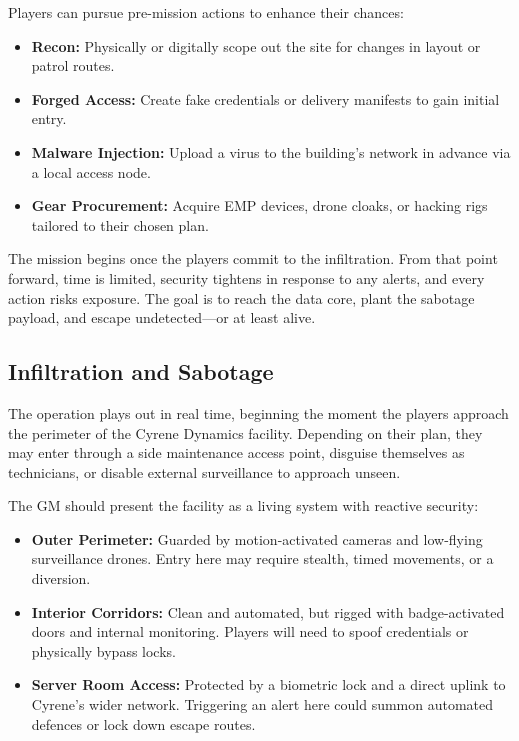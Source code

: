 Players can pursue pre-mission actions to enhance their chances:
\begin{itemize}
    \item \textbf{Recon:} Physically or digitally scope out the site for changes in layout or patrol routes.
    \item \textbf{Forged Access:} Create fake credentials or delivery manifests to gain initial entry.
    \item \textbf{Malware Injection:} Upload a virus to the building's network in advance via a local access node.
    \item \textbf{Gear Procurement:} Acquire EMP devices, drone cloaks, or hacking rigs tailored to their chosen plan.
\end{itemize}

The mission begins once the players commit to the infiltration. From that point forward, time is limited, security tightens in response to any alerts, and every action risks exposure. The goal is to reach the data core, plant the sabotage payload, and escape undetected—or at least alive.


\subsection*{Infiltration and Sabotage}

The operation plays out in real time, beginning the moment the players approach the perimeter of the Cyrene Dynamics facility. Depending on their plan, they may enter through a side maintenance access point, disguise themselves as technicians, or disable external surveillance to approach unseen.

The GM should present the facility as a living system with reactive security:

\begin{itemize}
    \item \textbf{Outer Perimeter:} Guarded by motion-activated cameras and low-flying surveillance drones. Entry here may require stealth, timed movements, or a diversion.
    \item \textbf{Interior Corridors:} Clean and automated, but rigged with badge-activated doors and internal monitoring. Players will need to spoof credentials or physically bypass locks.
    \item \textbf{Server Room Access:} Protected by a biometric lock and a direct uplink to Cyrene’s wider network. Triggering an alert here could summon automated defences or lock down escape routes.
\end{itemize}

